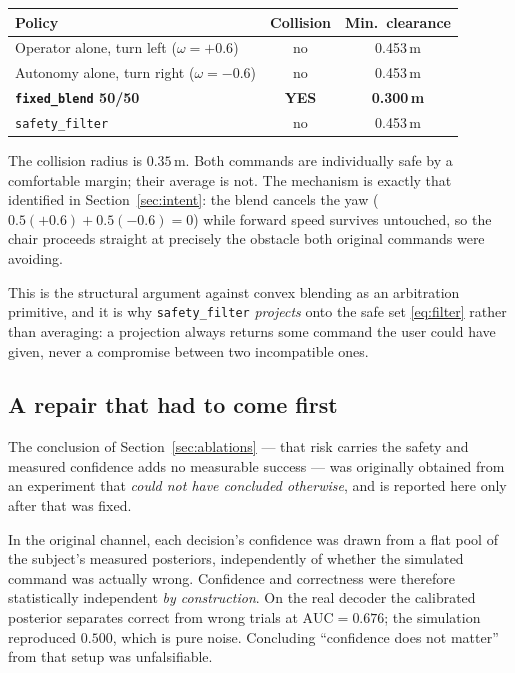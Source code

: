 \documentclass[11pt,a4paper]{article}
\newcommand{\vfixed}{\texttt{fixed\_blend}}
\newcommand{\vsafety}{\texttt{safety\_filter}}
\theoremstyle{plain}
\theoremstyle{definition}
\begin{document}
\begin{center}
\small
\begin{tabular}{@{}lcc@{}}
\toprule
Policy & Collision & Min.\ clearance \\
\midrule
Operator alone, turn left ($\omega = +0.6$)  & no  & 0.453\,m \\
Autonomy alone, turn right ($\omega = -0.6$) & no  & 0.453\,m \\
\textbf{\vfixed{} 50/50}                     & \textbf{YES} & \textbf{0.300\,m} \\
\vsafety{}                                   & no  & 0.453\,m \\
\bottomrule
\end{tabular}
\end{center}

The collision radius is $0.35$\,m. Both commands are individually safe
by a comfortable margin; their average is not. The mechanism is exactly
that identified in Section~\ref{sec:intent}: the blend cancels the yaw
($0.5(+0.6) + 0.5(-0.6) = 0$) while forward speed survives untouched, so
the chair proceeds straight at precisely the obstacle both original
commands were avoiding.

This is the structural argument against convex blending as an
arbitration primitive, and it is why \vsafety{} \emph{projects} onto the
safe set \eqref{eq:filter} rather than averaging: a projection always
returns some command the user could have given, never a compromise
between two incompatible ones.

\subsection{A repair that had to come first}
\label{sec:repair}

The conclusion of Section~\ref{sec:ablations} --- that risk carries the
safety and measured confidence adds no measurable success --- was originally obtained from an experiment that
\emph{could not have concluded otherwise}, and is reported here only
after that was fixed.

In the original channel, each decision's confidence was drawn from a flat
pool of the subject's measured posteriors, independently of whether the
simulated command was actually wrong. Confidence and correctness were
therefore statistically independent \emph{by construction}. On the real
decoder the calibrated posterior separates correct from wrong trials at
$\mathrm{AUC} = 0.676$; the simulation reproduced $0.500$, which is pure
noise. Concluding ``confidence does not matter'' from that setup was
unfalsifiable.
\end{document}
